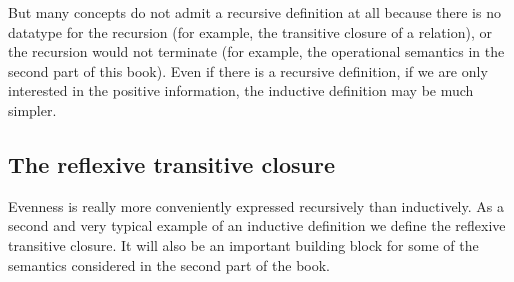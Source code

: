 \begin{isabellebody}
\begin{isamarkuptext}
But many concepts do not admit a recursive definition at all because there is
no datatype for the recursion (for example, the transitive closure of a
relation), or the recursion would not terminate (for example, the operational
semantics in the second part of this book). Even if there is a recursive
definition, if we are only interested in the positive information, the
inductive definition may be much simpler.

\subsection{The reflexive transitive closure}
\label{sec:star}

Evenness is really more conveniently expressed recursively than inductively.
As a second and very typical example of an inductive definition we define the
reflexive transitive closure. It will also be an important building block for
some of the semantics considered in the second part of the book.


\end{isamarkuptext}
\end{isabellebody}
